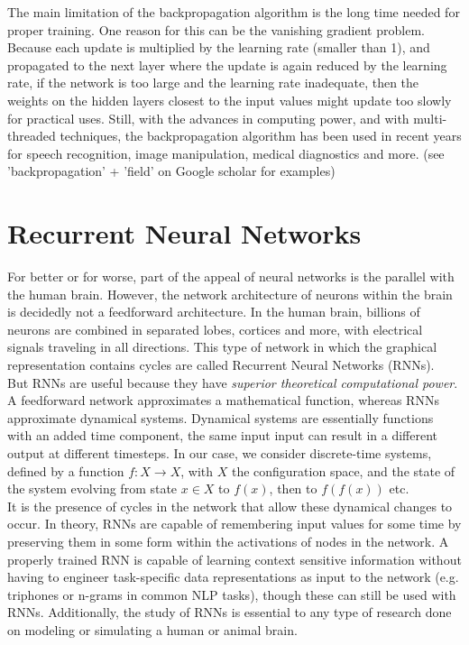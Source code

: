 \documentclass[12pt,oneside]{CUNY_CS_PhD}
\begin{document}
The main limitation of the backpropagation algorithm is the long time needed for proper training. One reason for this can be the vanishing gradient problem. Because each update is multiplied by the learning rate (smaller than 1), and propagated to the next layer where the update is again reduced by the learning rate, if the network is too large and the learning rate inadequate, then the weights on the hidden layers closest to the input values might update too slowly for practical uses. Still, with the advances in computing power, and with multi-threaded techniques, the backpropagation algorithm has been used in recent years for speech recognition, image manipulation, medical diagnostics and more.
(see 'backpropagation' + 'field' on Google scholar for examples)

\section{Recurrent Neural Networks}
For better or for worse, part of the appeal of neural networks is the parallel with the human brain. However, the network architecture of neurons within the brain is decidedly not a feedforward architecture. In the human brain, billions of neurons are combined in separated lobes, cortices and more, with electrical signals traveling in all directions. This type of network in which the graphical representation contains cycles are called Recurrent Neural Networks (RNNs).\\
 But RNNs are useful because they have \textit{superior theoretical computational power}. A feedforward network approximates a mathematical function, whereas RNNs approximate dynamical systems. Dynamical systems are essentially functions with an added time component, the same input input can result in a different output at different timesteps. In our case, we consider discrete-time systems, defined by a function $f: X \rightarrow X$, with $X$ the configuration space, and the state of the system evolving from state $x \in X$ to $f(x)$, then to $f(f(x))$ etc.\\
It is the presence of cycles in the network that allow these dynamical changes to occur. In theory, RNNs are capable of remembering input values for some time by preserving them in some form within the activations of nodes in the network. A properly trained RNN is capable of learning context sensitive information without having to engineer task-specific data representations as input to the network (e.g. triphones or n-grams in common NLP tasks), though these can still be used with RNNs. Additionally, the study of RNNs is essential to any type of research done on modeling or simulating a human or animal brain.
\end{document}
